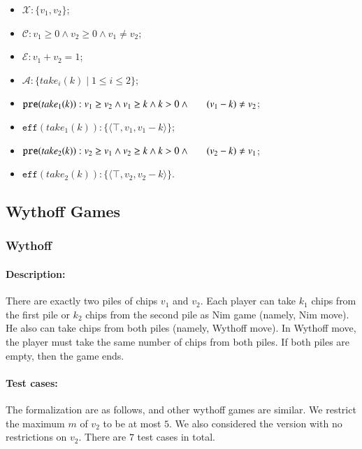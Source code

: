 \documentclass[review]{elsarticle}
\newcommand{\set}[1]{\{ #1 \}}
\newcommand{\tuple}[1]{\langle {#1} \rangle}
\newcommand{\true}{\top}
\newcommand{\statevar}{\mathcal{X}}
\newcommand{\act}{\mathcal{A}}
\newcommand{\constraint}{\mathcal{C}}
\newcommand{\estate}{\mathcal{E}}
\newcommand{\pre}{\mathtt{pre}}
\newcommand{\eff}{\mathtt{eff}}
\begin{document}
\begin{itemize}
	\item $\statevar: \set{v_1, v_2}$;
	\item $\constraint: v_1 \ge 0 \wedge v_2 \ge 0 \wedge v_1 \neq v_2$;
	\item $\estate:  v_1 + v_2  =1 $;
	\item $\act:\set{take_i(k){\mid}1\le i \le2}$;
	\item $\pre(take_1(k)) : v_1 \ge v_2 \wedge v_1 \ge k \wedge k > 0 \wedge \\ \hspace*{6mm}
	(v_1-k) \neq v_2$;
	\item $\eff(take_1(k)) : \set{\tuple{\true,  v_1,  v_1 - k}}$;
	\item $\pre(take_2(k)) :  v_2 \ge v_1 \wedge v_2 \ge k \wedge k > 0 \wedge \\ \hspace*{6mm}
	(v_2-k) \neq v_1 $;
	\item $\eff(take_2(k)) : \set{\tuple{\true,  v_2,  v_2 - k}}$.
\end{itemize}

\subsection{Wythoff Games}



\subsubsection{Wythoff \protect\cite{Wyt1907}}

\paragraph{Description:}  
There are exactly two piles of chips $v_1$ and $v_2$.
Each player can take $k_1$ chips from the first pile or $k_2$ chips from the second pile as Nim game (namely, Nim move).
He also can take chips from both piles (namely, Wythoff move).
In Wythoff move, the player must take the same number of chips from both piles.
If both piles are empty, then the game ends.	

\paragraph{Test cases:}
The formalization are as follows, and other wythoff games are similar.
We restrict the maximum $m$ of $v_2$ to be at most $5$.
We also considered the version with no restrictions on $v_2$.
There are $7$ test cases in total.
\end{document}
